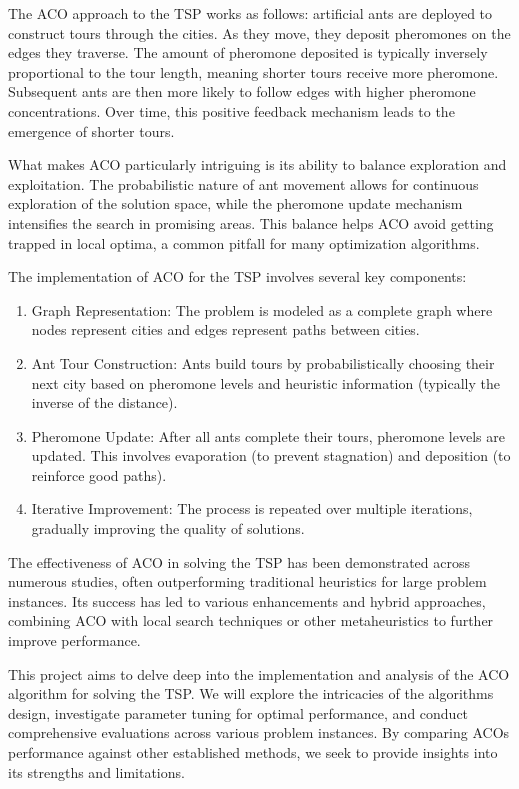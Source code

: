 \documentclass[
]{article}
\begin{document}
The ACO approach to the TSP works as follows: artificial ants are
deployed to construct tours through the cities. As they move, they
deposit pheromones on the edges they traverse. The amount of pheromone
deposited is typically inversely proportional to the tour length,
meaning shorter tours receive more pheromone. Subsequent ants are then
more likely to follow edges with higher pheromone concentrations. Over
time, this positive feedback mechanism leads to the emergence of shorter
tours.

What makes ACO particularly intriguing is its ability to balance
exploration and exploitation. The probabilistic nature of ant movement
allows for continuous exploration of the solution space, while the
pheromone update mechanism intensifies the search in promising areas.
This balance helps ACO avoid getting trapped in local optima, a common
pitfall for many optimization algorithms.

The implementation of ACO for the TSP involves several key components:

\begin{enumerate}
\def\labelenumi{\arabic{enumi}.}
\item
  Graph Representation: The problem is modeled as a complete graph where
  nodes represent cities and edges represent paths between cities.
\item
  Ant Tour Construction: Ants build tours by probabilistically choosing
  their next city based on pheromone levels and heuristic information
  (typically the inverse of the distance).
\item
  Pheromone Update: After all ants complete their tours, pheromone
  levels are updated. This involves evaporation (to prevent stagnation)
  and deposition (to reinforce good paths).
\item
  Iterative Improvement: The process is repeated over multiple
  iterations, gradually improving the quality of solutions.
\end{enumerate}

The effectiveness of ACO in solving the TSP has been demonstrated across
numerous studies, often outperforming traditional heuristics for large
problem instances. Its success has led to various enhancements and
hybrid approaches, combining ACO with local search techniques or other
metaheuristics to further improve performance.

This project aims to delve deep into the implementation and analysis of
the ACO algorithm for solving the TSP. We will explore the intricacies
of the algorithm\textquotesingle s design, investigate parameter tuning
for optimal performance, and conduct comprehensive evaluations across
various problem instances. By comparing ACO\textquotesingle s
performance against other established methods, we seek to provide
insights into its strengths and limitations.
\end{document}
